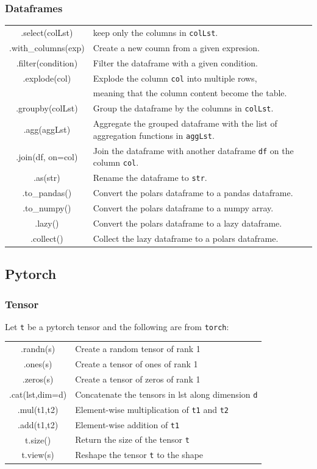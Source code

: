 \documentclass[5pt]{article}
\begin{document}
\begin{multicols}{2}
\subsubsection{Dataframes}
\begin{tabular}{C L}
.select(colLst)     &   keep only the columns in \texttt{colLst}.\\
.with\_columns(exp) &   Create a new coumn from a given expresion.\\
.filter(condition)  &   Filter the dataframe with a given condition.\\
.explode(col)       &   Explode the column \texttt{col} into multiple rows,\\
                    &   meaning that the column content become the table.\\
.groupby(colLst)    &   Group the dataframe by the columns in \texttt{colLst}.\\

.agg(aggLst)        &   Aggregate the grouped dataframe with the list of aggregation functions in \texttt{aggLst}.\\
.join(df, on=col)   &   Join the dataframe with another dataframe \texttt{df} on the column \texttt{col}.\\
.as(str)            &   Rename the dataframe to \texttt{str}.\\
.to\_pandas()       &   Convert the polars dataframe to a pandas dataframe.\\
.to\_numpy()        &   Convert the polars dataframe to a numpy array.\\
.lazy()             &   Convert the polars dataframe to a lazy dataframe.\\
.collect()          &   Collect the lazy dataframe to a polars dataframe.\\
\end{tabular}

\subsection{Pytorch}
\subsubsection{Tensor}
Let \texttt{t} be a pytorch tensor and the following are from \texttt{torch}:\\
\begin{tabular}{C L}
.randn(s)     & Create a random tensor of rank 1\\
.ones(s)      & Create a tensor of ones of rank 1\\
.zeros(s)     & Create a tensor of zeros of rank 1\\
.cat(lst,dim=d) & Concatenate the tensors in lst along dimension \texttt{d}\\
.mul(t1,t2)     & Element-wise multiplication of \texttt{t1} and \texttt{t2}\\
.add(t1,t2)     & Element-wise addition of \texttt{t1}\\
t.size()     & Return the size of the tensor \texttt{t}\\
t.view(s)     & Reshape the tensor \texttt{t} to the shape
\end{tabular}


\end{multicols}
\end{document}
